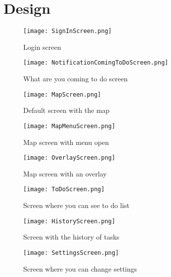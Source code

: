 \section{Design}



\begin{figure}[h]
		\centering
		\texttt{[image: SignInScreen.png]}
		\caption{Login screen}\label{signInScreen}
	\endminipage\hfill
		\centering
		\texttt{[image: NotificationComingToDoScreen.png]}
		\caption{What are you coming to do screen}\label{comingToDoScreen}
	\endminipage\hfill
\end{figure}

\begin{figure}[h]
		\centering
		\texttt{[image: MapScreen.png]}
		\caption{Default screen with the map}\label{mapScreen}
	\endminipage\hfill
		\centering
		\texttt{[image: MapMenuScreen.png]}
		\caption{Map screen with menu open}\label{mapMenuScreen}
	\endminipage\hfill
		\centering
		\texttt{[image: OverlayScreen.png]}
		\caption{Map screen with an overlay}\label{overlayScreen}
	\endminipage\hfill
\end{figure}

\begin{figure}[h]
	\centering
	\texttt{[image: ToDoScreen.png]}
	\caption{Screen where you can see to do list}\label{toDoScreen}
	\endminipage\hfill
	\centering
	\texttt{[image: HistoryScreen.png]}
	\caption{Screen with the history of tasks}\label{historyScreen}
	\endminipage\hfill
	\centering
	\texttt{[image: SettingsScreen.png]}
	\caption{Screen where you can change settings}\label{settingsScreen}
	\endminipage\hfill
\end{figure}